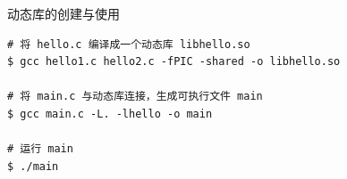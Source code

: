 \begin{frame}[fragile]{动态库的创建与使用}

  \begin{lstlisting}
# 将 hello.c 编译成一个动态库 libhello.so
$ gcc hello1.c hello2.c -fPIC -shared -o libhello.so

# 将 main.c 与动态库连接，生成可执行文件 main
$ gcc main.c -L. -lhello -o main 

# 运行 main
$ ./main
  \end{lstlisting}
  
\end{frame}


